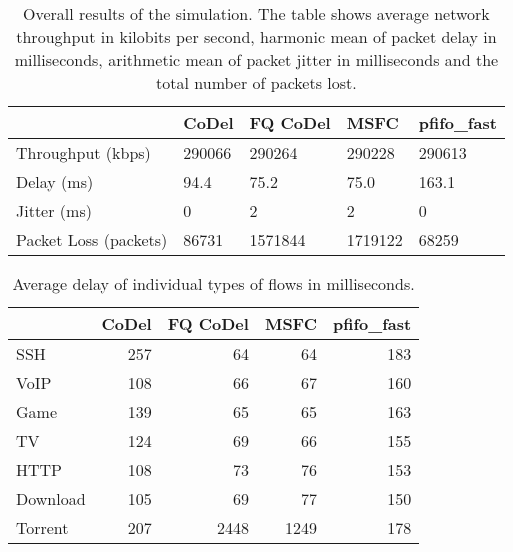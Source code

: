 \begin{table}[]
	\centering
	\begin{tabular}{@{}lllll@{}}
		\toprule
								& CoDel & FQ CoDel & MSFC & pfifo\_fast  \\ \midrule
		Throughput (kbps)       & 290066    & 290264 & 290228   & 290613 \\
		Delay (ms)              & 94.4      & 75.2   & 75.0     & 163.1    \\
		Jitter (ms)             & 0         & 2      & 2        & 0      \\
		Packet Loss (packets)   & 86731     & 1571844& 1719122  & 68259  \\ \bottomrule
	\end{tabular}
	\caption{Overall results of the simulation. The table shows average network throughput in kilobits per second, harmonic mean of packet delay in milliseconds, arithmetic mean of packet jitter in milliseconds and the total number of packets lost.}
	\label{tab:results_A}
\end{table}


\begin{table}
	\centering
	
	\begin{tabular}{@{}l|rrrr@{}}
		\toprule
						& CoDel & FQ CoDel & MSFC & pfifo\_fast  \\ \midrule
		SSH             &     257       &     64        &     64        &     183       \\
		VoIP            &     108       &     66        &     67        &     160       \\
		Game            &     139       &     65        &     65        &     163       \\
		TV              &     124       &     69        &     66        &     155       \\
		HTTP            &     108       &     73        &     76        &     153       \\
		Download        &     105       &     69        &     77        &     150       \\
		Torrent         &     207       &     2448      &     1249      &     178       \\ \bottomrule
	\end{tabular}
	\caption{Average delay of individual types of flows in milliseconds.}
	\label{tab:delay_A}
\end{table}

